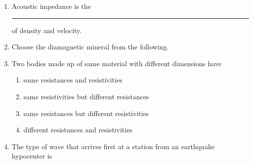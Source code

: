 \documentclass[journal,12pt,onecolumn]{IEEEtran}
\theoremstyle{remark}
\begin{document}
\begin{enumerate}
        \item Acoustic impedance is the \rule{3cm}{0.15mm} of density and velocity. \hfill{}\hfill{}
            \begin{enumerate}
            \end{enumerate}

        \item Choose the diamagnetic mineral from the following. \hfill{}
            \begin{enumerate}
            \end{enumerate}

        \item Two bodies made up of same material with different dimensions have \hfill{}
            \begin{enumerate}
                    \item same resistances and resistivities
                    \item same resistivities but different resistances
                    \item same resistances but different resistivities
                    \item different resistances and resistivities
            \end{enumerate}

        \item The type of wave that arrives first at a station from an earthquake hypocenter is \hfill{}
            \begin{enumerate}
            \end{enumerate}


\end{enumerate}
\end{document}
